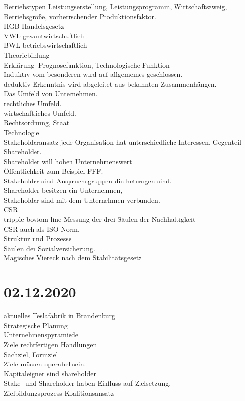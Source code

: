 \documentclass{article}
\begin{document}
	Betriebstypen Leistungserstellung, Leistungsprogramm, Wirtschaftszweig, Betriebsgröße, vorherrschender Produktionsfaktor. \\
	HGB Handelsgesetz \\
	VWL gesamtwirtschaftlich \\
	BWL betriebswirtschaftlich \\
	Theoriebildung \\
	Erklärung, Prognosefunktion, Technologische Funktion \\
	Induktiv vom besonderen wird auf allgemeines geschlossen. \\
	deduktiv Erkenntnis wird abgeleitet aus bekannten Zusammenhängen. \\
	Das Umfeld von Unternehmen. \\
	rechtliches Umfeld. \\
	wirtschaftliches Umfeld. \\
	Rechtsordnung, Staat \\
	Technologie \\
	Stakeholderansatz jede Organisation hat unterschiedliche Interessen. Gegenteil Shareholder. \\
	Shareholder will hohen Unternehmenswert \\
	Öffentlichkeit zum Beispiel FFF. \\
	Stakeholder sind Anspruchsgruppen die heterogen sind.  \\
	Shareholder besitzen ein Unternehmen, \\
	Stakeholder sind mit dem Unternehmen verbunden. \\
	CSR \\
	tripple bottom line Messung der drei Säulen der Nachhaltigkeit \\
	CSR auch als ISO Norm. \\
	Struktur und Prozesse \\
	Säulen der Sozialversicherung. \\
	Magisches Viereck nach dem Stabilitätsgesetz
	\section*{02.12.2020}
	aktuelles Teslafabrik in Brandenburg \\
	Strategische Planung \\
	Unternehmenspyramiede \\
	Ziele rechtfertigen Handlungen \\
	Sachziel, Formziel \\
	Ziele müssen operabel sein. \\
	Kapitaleigner sind shareholder \\
	Stake- und Shareholder haben Einfluss auf Zielsetzung. \\
	Zielbildungsprozess Koalitionsansatz \\
\end{document}
